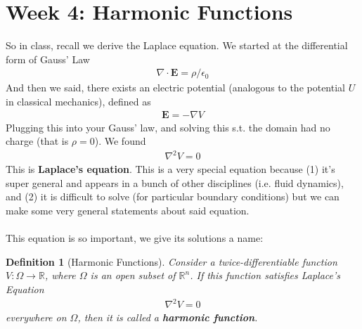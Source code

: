 \documentclass[12pt,fleqn]{article}
\numberwithin{equation}{section} %
\newtheorem{definition}{Definition}
\begin{document}
\section{Week 4: Harmonic Functions}
So in class, recall we derive the Laplace equation. We started at the differential form of Gauss' Law
\begin{align}
	\nabla \cdot \mathbf E = \rho / \epsilon_0
\end{align}
And then we said, there exists an electric potential (analogous to the potential $U$ in classical mechanics), defined as
\begin{align}
	\mathbf E = - \nabla V
\end{align}
Plugging this into your Gauss' law, and solving this s.t. the domain had no charge (that is $\rho = 0$). We found
\begin{align}
	\nabla^2 V = 0
\end{align}
This is \textbf{Laplace's equation}. This is a very special equation because (1) it's super general and appears in a bunch of other disciplines (i.e. fluid dynamics), and (2) it is difficult to solve (for particular boundary conditions) but we can make some very general statements about said equation.\\
\\
This equation is so important, we give its solutions a name:
\begin{definition}
	[Harmonic Functions] Consider a twice-differentiable function $V : \Omega \to \mathbb R$, where $\Omega$ is an open subset of $\mathbb R^n$. If this function satisfies Laplace's Equation
	\begin{align}
		\nabla^2 V = 0
	\end{align}
	everywhere on $\Omega$, then it is called a \textbf{harmonic function}.
\end{definition}
\end{document}
